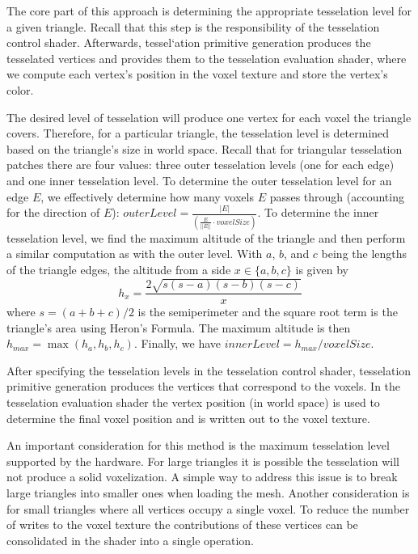 The core part of this approach is determining the appropriate tesselation level for a given triangle. Recall that this step is the responsibility of the tesselation control shader. Afterwards, tessel`ation primitive generation produces the tesselated vertices and provides them to the tesselation evaluation shader, where we compute each vertex's position in the voxel texture and store the vertex's color.

The desired level of tesselation will produce one vertex for each voxel the triangle covers. Therefore, for a particular triangle, the tesselation level is determined based on the triangle's size in world space. Recall that for triangular tesselation patches there are four values: three outer tesselation levels (one for each edge) and one inner tesselation level. To determine the outer tesselation level for an edge $E$, we effectively determine how many voxels $E$ passes through (accounting for the direction of $E$): $\displaystyle outerLevel = \frac{|E|}{(\frac{E}{||E||} \cdot voxelSize)}$. To determine the inner tesselation level, we find the maximum altitude of the triangle and then perform a similar computation as with the outer level. With $a$, $b$, and $c$ being the lengths of the triangle edges, the altitude from a side $x \in \{a, b, c\}$ is given by
\[
    h_x = \frac{2 \sqrt{s(s-a)(s-b)(s-c)}}{x}
\]
where $s = (a + b + c) / 2$ is the semiperimeter and the square root term is the triangle's area using Heron's Formula. The maximum altitude is then $h_{max} = \max(h_a, h_b, h_c)$. Finally, we have $innerLevel = h_{max} / voxelSize$.

After specifying the tesselation levels in the tesselation control shader, tesselation primitive generation produces the vertices that correspond to the voxels. In the tesselation evaluation shader the vertex position (in world space) is used to determine the final voxel position and is written out to the voxel texture.

An important consideration for this method is the maximum tesselation level supported by the hardware. For large triangles it is possible the tesselation will not produce a solid voxelization. A simple way to address this issue is to break large triangles into smaller ones when loading the mesh. Another consideration is for small triangles where all vertices occupy a single voxel. To reduce the number of writes to the voxel texture the contributions of these vertices can be consolidated in the shader into a single operation.

